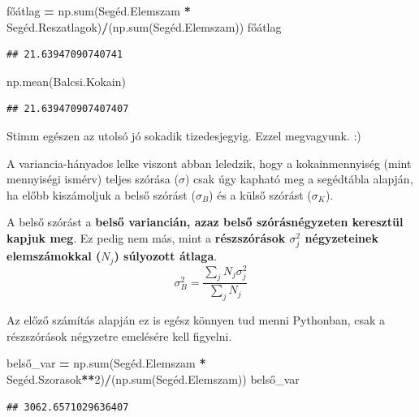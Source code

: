 \documentclass[
]{book}
\newenvironment{Shaded}{\begin{snugshade}}{\end{snugshade}}
\newcommand{\BuiltInTok}[1]{#1}
\newcommand{\DecValTok}[1]{\textcolor[rgb]{0.00,0.00,0.81}{#1}}
\newcommand{\NormalTok}[1]{#1}
\newcommand{\OperatorTok}[1]{\textcolor[rgb]{0.81,0.36,0.00}{\textbf{#1}}}
\begin{document}
\begin{Shaded}
\begin{Highlighting}[]
\NormalTok{főátlag }\OperatorTok{=}\NormalTok{ np.}\BuiltInTok{sum}\NormalTok{(Segéd.Elemszam }\OperatorTok{*}\NormalTok{ Segéd.Reszatlagok)}\OperatorTok{/}\NormalTok{(np.}\BuiltInTok{sum}\NormalTok{(Segéd.Elemszam))}
\NormalTok{főátlag}
\end{Highlighting}
\end{Shaded}

\begin{verbatim}
## 21.63947090740741
\end{verbatim}

\begin{Shaded}
\begin{Highlighting}[]
\NormalTok{np.mean(Balcsi.Kokain)}
\end{Highlighting}
\end{Shaded}

\begin{verbatim}
## 21.639470907407407
\end{verbatim}

Stimm egészen az utolsó jó sokadik tizedesjegyig. Ezzel megvagyunk. :)

A variancia-hányados lelke viszont abban leledzik, hogy a kokainmennyiség (mint mennyiségi ismérv) teljes szórása (\(\sigma\)) csak úgy kapható meg a segédtábla alapján, ha előbb kiszámoljuk a belső szórást (\(\sigma_B\)) és a külső szórást (\(\sigma_K\)).

A belső szórást a \textbf{belső variancián, azaz belső szórásnégyzeten keresztül kapjuk meg}. Ez pedig nem más, mint a \textbf{részszórások \(\sigma_j^2\) négyzeteinek elemszámokkal (\(N_j\)) súlyozott átlaga}. \[\sigma_B^2=\frac{\sum_j{N_j\sigma_j^2}}{\sum_j{N_j}}\]

Az előző számítás alapján ez is egész könnyen tud menni Pythonban, csak a részszórások négyzetre emelésére kell figyelni.

\begin{Shaded}
\begin{Highlighting}[]
\NormalTok{belső\_var }\OperatorTok{=}\NormalTok{ np.}\BuiltInTok{sum}\NormalTok{(Segéd.Elemszam }\OperatorTok{*}\NormalTok{ Segéd.Szorasok}\OperatorTok{**}\DecValTok{2}\NormalTok{)}\OperatorTok{/}\NormalTok{(np.}\BuiltInTok{sum}\NormalTok{(Segéd.Elemszam))}
\NormalTok{belső\_var}
\end{Highlighting}
\end{Shaded}

\begin{verbatim}
## 3062.6571029636407
\end{verbatim}
\end{document}
